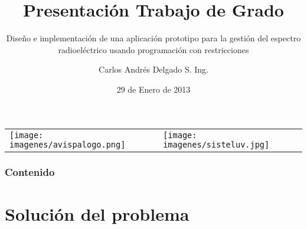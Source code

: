 \documentclass{beamer}
\author{Carlos Andr\'es Delgado S. Ing. }
\title{Presentaci\'on Trabajo de Grado}
\subtitle{Diseño e implementación de una aplicaci\'on prototipo para la gestión del espectro radioel\'ectrico usando programaci\'on con restricciones}
\institute{Facultad de Ingeniería. Universidad del Valle}
\date{29 de Enero de 2013}
\begin{document}
	\begin{frame}
		\begin{tabular}{p{6.5cm}p{3cm}}
			\texttt{[image: imagenes/avispalogo.png]} & \texttt{[image: imagenes/sisteluv.jpg]} 	\\
		\end{tabular}
		\titlepage	 
		
	\end{frame}
	\begin{frame}
 		\frametitle{Contenido}
		\tableofcontents[hideallsections]
	\end{frame}
	
	
	
	
	
	\section{Solución del problema}
	
	
	
	
	
	
	
	
	
	
\end{document}
